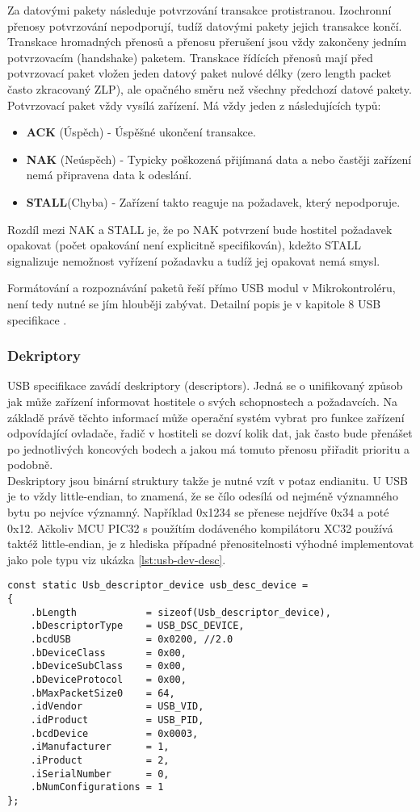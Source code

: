 Za datovými pakety následuje potvrzování transakce protistranou. Izochronní přenosy potvrzování nepodporují, tudíž datovými pakety jejich transakce končí. Transkace hromadných přenosů a přenosu přerušení jsou vždy zakončeny jedním potvrzovacím (handshake) paketem.  Transkace řídících přenosů mají před potvrzovací paket vložen jeden datový paket nulové délky (zero length packet často zkracovaný ZLP), ale opačného směru než všechny předchozí datové pakety. Potvrzovací paket vždy vysílá zařízení. Má vždy jeden z následujících typů:
\begin{itemize}
\item \textbf{ACK} (Úspěch) - Úspěšné ukončení transakce.
\item \textbf{NAK} (Neúspěch) - Typicky poškozená přijímaná data a nebo častěji zařízení nemá připravena data k odeslání.
\item \textbf{STALL}(Chyba) - Zařízení takto reaguje na požadavek, který nepodporuje.
\end{itemize}
Rozdíl mezi NAK a STALL je, že po NAK potvrzení bude hostitel požadavek opakovat (počet opakování není explicitně specifikován), kdežto STALL signalizuje nemožnost vyřízení požadavku a tudíž jej opakovat nemá smysl.

Formátování a rozpoznávání paketů řeší přímo USB modul v Mikrokontroléru, není tedy nutné se jím hlouběji zabývat. Detailní popis je v kapitole 8 USB specifikace \cite{usb-spec}.


\subsubsection{Dekriptory}
USB specifikace zavádí deskriptory (descriptors). Jedná se o unifikovaný způsob jak může zařízení informovat hostitele o svých schopnostech a požadavcích. Na základě právě těchto informací může operační systém vybrat pro funkce zařízení odpovídající ovladače, řadič v hostiteli se dozví kolik dat, jak často bude přenášet po jednotlivých koncových bodech a jakou má tomuto přenosu přiřadit prioritu a podobně.\\
Deskriptory jsou binární struktury takže je nutné vzít v potaz endianitu. U USB je to vždy little-endian, to znamená, že se čílo odesílá od nejméně významného bytu po nejvíce významný. Například 0x1234 se přenese nejdříve 0x34 a poté 0x12. Ačkoliv MCU PIC32 s použítím dodáveného kompilátoru XC32 používá taktéž little-endian, je z hlediska případné přenositelnosti výhodné implementovat jako pole typu  viz ukázka \ref{lst:usb-dev-desc}.
\begin{lstlisting}[caption=Deskriptor zařízení.]
const static Usb_descriptor_device usb_desc_device =
{
    .bLength            = sizeof(Usb_descriptor_device),
    .bDescriptorType    = USB_DSC_DEVICE,
    .bcdUSB             = 0x0200, //2.0
    .bDeviceClass       = 0x00,
    .bDeviceSubClass    = 0x00,
    .bDeviceProtocol    = 0x00,
    .bMaxPacketSize0    = 64,
    .idVendor           = USB_VID,
    .idProduct          = USB_PID,
    .bcdDevice          = 0x0003,
    .iManufacturer      = 1,
    .iProduct           = 2,
    .iSerialNumber      = 0,
    .bNumConfigurations = 1
};
\end{lstlisting}
\label{lst:usb-dev-desc}


